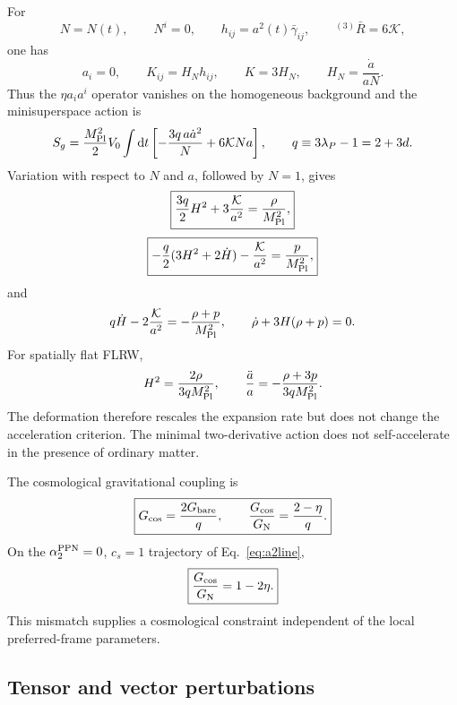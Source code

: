 \documentclass[11pt]{article}
\newcommand{\Mpl}{M_{\rm Pl}}
\newcommand{\GN}{G_{\rm N}}
\newcommand{\Gc}{G_{\rm cos}}
\newcommand{\Gb}{G_{\rm bare}}
\newcommand{\dd}{\mathrm{d}}
\newcommand{\cs}{c_s}
\newcommand{\atwo}{\alpha_2^{\rm PPN}}
\begin{document}
For
\begin{equation}
N=N(t),\qquad N^i=0,\qquad h_{ij}=a^2(t)\bar\gamma_{ij},
\qquad {}^{(3)}\bar R=6\mathcal K,
\end{equation}
one has
\begin{equation}
a_i=0,\qquad K_{ij}=H_Nh_{ij},\qquad K=3H_N,
\qquad H_N=\frac{\dot a}{aN}.
\end{equation}
Thus the $\eta a_i a^i$ operator vanishes on the homogeneous background and the minisuperspace action is
\begin{equation}
S_g=\frac{\Mpl^2}{2}V_0\int\dd t
\left[-\frac{3q\,a\dot a^2}{N}+6\mathcal KNa\right],
\qquad q\equiv3\lambda_P-1=2+3d.
\end{equation}
Variation with respect to $N$ and $a$, followed by $N=1$, gives
\begin{equation}
\boxed{\frac{3q}{2}H^2+3\frac{\mathcal K}{a^2}=\frac{\rho}{\Mpl^2},}
\label{eq:cosFriedmann}
\end{equation}
\begin{equation}
\boxed{-\frac{q}{2}(3H^2+2\dot H)-\frac{\mathcal K}{a^2}
=\frac{p}{\Mpl^2},}
\label{eq:cosAcceleration}
\end{equation}
and
\begin{equation}
q\dot H-2\frac{\mathcal K}{a^2}=-\frac{\rho+p}{\Mpl^2},
\qquad
\dot\rho+3H(\rho+p)=0.
\label{eq:cosRayContinuity}
\end{equation}
For spatially flat FLRW,
\begin{equation}
H^2=\frac{2\rho}{3q\Mpl^2},
\qquad
\frac{\ddot a}{a}=-\frac{\rho+3p}{3q\Mpl^2}.
\label{eq:cosNoSelfAcceleration}
\end{equation}
The deformation therefore rescales the expansion rate but does not change the acceleration criterion.  The minimal two-derivative action does not self-accelerate in the presence of ordinary matter.

The cosmological gravitational coupling is
\begin{equation}
\boxed{\Gc=\frac{2\Gb}{q},
\qquad
\frac{\Gc}{\GN}=\frac{2-\eta}{q}.}
\label{eq:GcosRatio}
\end{equation}
On the $\atwo=0$, $\cs=1$ trajectory of Eq.~\eqref{eq:a2line},
\begin{equation}
\boxed{\frac{\Gc}{\GN}=1-2\eta.}
\label{eq:GcosTrajectory}
\end{equation}
This mismatch supplies a cosmological constraint independent of the local preferred-frame parameters.

\subsection{Tensor and vector perturbations}
\end{document}
